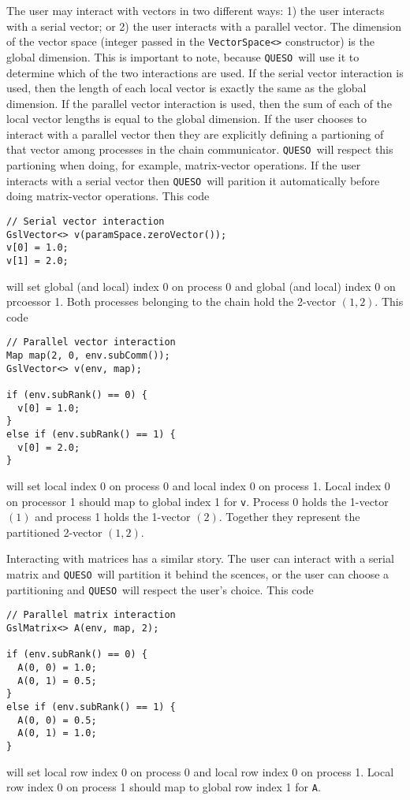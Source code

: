 \documentclass{article}
\newcommand{\Queso}{\texttt{QUESO}}
\begin{document}
The user may interact with vectors in two different ways: 1) the user interacts
with a serial vector; or 2) the user interacts with a parallel vector.  The
dimension of the vector space (integer passed in the \lstinline|VectorSpace<>|
constructor) is the global dimension.  This is important to note, because
\Queso\ will use it to determine which of the two interactions are used.
If the serial vector interaction is used, then the length of each local vector
is exactly the same as the global dimension.  If the parallel vector
interaction is used, then the sum of each of the local vector lengths is equal
to the global dimension.  If the user chooses to interact with a parallel
vector then they are explicitly defining a partioning of that vector among
processes in the chain communicator.  \Queso\ will respect this partioning
when doing, for example, matrix-vector operations.  If the user interacts with
a serial vector then \Queso\ will parition it automatically before doing
matrix-vector operations.  This code
\begin{lstlisting}
// Serial vector interaction
GslVector<> v(paramSpace.zeroVector());
v[0] = 1.0;
v[1] = 2.0;
\end{lstlisting}
will set global (and local) index 0 on process 0 and global (and local) index 0
on prcoessor 1.  Both processes belonging to the chain hold the 2-vector
$(1, 2)$.  This code
\begin{lstlisting}
// Parallel vector interaction
Map map(2, 0, env.subComm());
GslVector<> v(env, map);

if (env.subRank() == 0) {
  v[0] = 1.0;
}
else if (env.subRank() == 1) {
  v[0] = 2.0;
}
\end{lstlisting}
will set local index 0 on process 0 and local index 0 on process 1.  Local
index 0 on processor 1 should map to global index 1 for \lstinline|v|.  Process
0 holds the 1-vector $(1)$ and process 1 holds the 1-vector $(2)$.  Together
they represent the partitioned 2-vector $(1, 2)$.

Interacting with matrices has a similar story.  The user can interact with a
serial matrix and \Queso\ will partition it behind the scences, or the user
can choose a partitioning and \Queso\ will respect the user's choice.  This
code
\begin{lstlisting}
// Parallel matrix interaction
GslMatrix<> A(env, map, 2);

if (env.subRank() == 0) {
  A(0, 0) = 1.0;
  A(0, 1) = 0.5;
}
else if (env.subRank() == 1) {
  A(0, 0) = 0.5;
  A(0, 1) = 1.0;
}
\end{lstlisting}
will set local row index 0 on process 0 and local row index 0 on process 1.
Local row index 0 on process 1 should map to global row index 1 for
\lstinline|A|.
\end{document}
